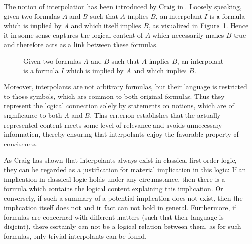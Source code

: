 

The notion of interpolation has been introduced by Craig in \cite{Craig57linear}.
Loosely speaking, given two formulas $A$ and $B$ such that $A$ implies $B$, an interpolant $I$ is a formula which is implied by $A$ and which itself implies $B$, as visualized in Figure~\ref{fig:interpol}.
Hence it in some sense captures the logical content of $A$ which necessarily makes $B$ true and therefore acts as a link between these formulas.

\begin{figure}[htbp]
	\centering
	\label{fig:interpol}
	\caption{Given two formulas $A$ and $B$ such that $A$ implies $B$, an interpolant is a formula $I$ which is implied by $A$ and which implies $B$.}
\end{figure}
Moreover, interpolants are not arbitrary formulas, but their language is restricted to those symbols, which are common to both original formulas.
Thus they represent the logical connection solely by statements on notions, which are of significance to both $A$ and $B$.
This criterion establishes that the actually represented content meets some level of relevance and avoids unnecessary information, thereby ensuring that interpolants enjoy the favorable property of conciseness.

As Craig has shown that interpolants always exist in classical first-order logic, they can be regarded as a justification for material implication in this logic:
If an implication in classical logic holds under any circumstance, then there is a formula which contains the logical content explaining this implication.
Or conversely, if such a summary of a potential implication does not exist, then the implication itself does not and in fact can not hold in general.
Furthermore, if formulas are concerned with different matters (such that their language is disjoint), there certainly can not be a logical relation between them, as for such formulas, only trivial interpolants can be found.

